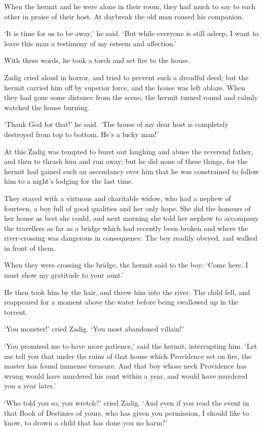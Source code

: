 \documentclass{article}
\begin{document}
\begin{center}
When the hermit and he were alone in their room, they had much to say to each other 
in praise of their host. At daybreak the old man roused his companion. 

`It is time for us to be away,' he said. `But while everyone is still asleep, I 
want to leave this man a testimony of my esteem and affection.' 

With these words, he took a torch and set fire to the house. 

Zadig cried aloud in horror, and tried to prevent such a dreadful deed; but the 
hermit carried him off by superior force, and the house was left ablaze. When they 
had gone some distance from the scene, the hermit turned round and calmly watched 
the house burning. 

`Thank God for that!' he said. `The house of my dear host is completely destroyed 
from top to bottom. He's a lucky man!' 

At this Zadig was tempted to burst out laughing and abuse the reverend father, 
and then to thrash him and run away; but he did none of these things, for the hermit 
had gained such an ascendancy over him that he was constrained to follow him to 
a night's lodging for the last time. 

They stayed with a virtuous and charitable widow, who had a nephew of fourteen, 
a boy full of good qualities and her only hope. She did the honours of her house 
as best she could, and next morning she told her nephew to accompany the travellers 
as far as a bridge which had recently been broken and where the river-crossing 
was dangerous in consequence. The boy readily obeyed, and walked in front of them. 

When they were crossing the bridge, the hermit said to the boy: `Come here. I must 
show my gratitude to your aunt.' 

He then took him by the hair, and threw him into the river. The child fell, and 
reappeared for a moment above the water before being swallowed up in the torrent. 

`You monster!' cried Zadig. `You most abandoned villain!' 

`You promised me to have more patience,' said the hermit, interrupting him. `Let 
me tell you that under the ruins of that house which Providence set on fire, the 
master has found immense treasure. And that boy whose neck Providence has wrung 
would have murdered his aunt within a year, and would have murdered you a year 
later.' 

`Who told you so, you wretch?' cried Zadig. `And even if you read the event in 
that Book of Destinies of yours, who has given you permission, I should like to 
know, to drown a child that has done you no harm?' 


\end{center}
\end{document}
